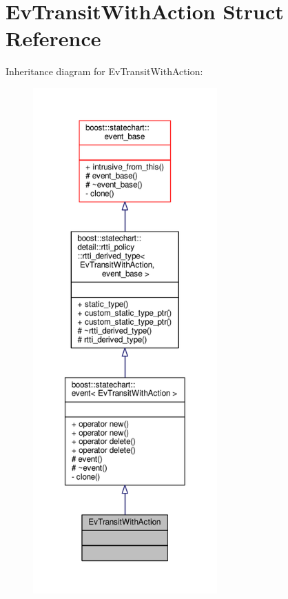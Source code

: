 \hypertarget{struct_ev_transit_with_action}{}\section{Ev\+Transit\+With\+Action Struct Reference}
\label{struct_ev_transit_with_action}


Inheritance diagram for Ev\+Transit\+With\+Action\+:
\nopagebreak
\begin{figure}[H]
\begin{center}
\leavevmode
\includegraphics[height=550pt]{struct_ev_transit_with_action__inherit__graph}
\end{center}
\end{figure}


